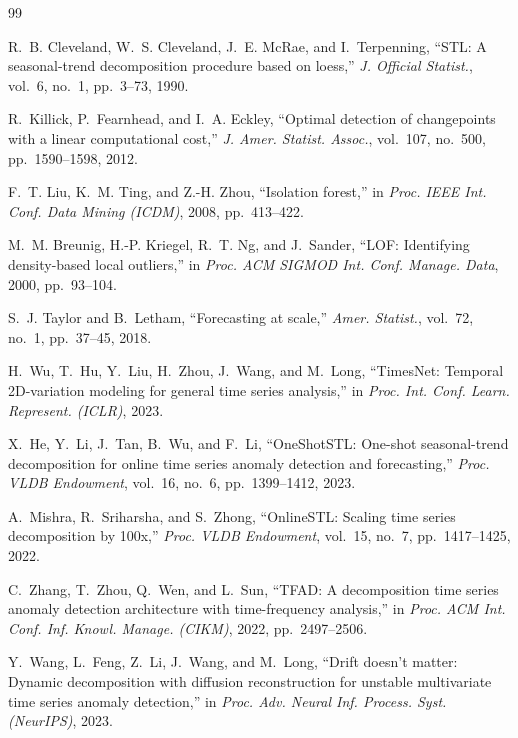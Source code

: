 \documentclass[10pt]{article}
\begin{document}
\begin{thebibliography}{99}
\RaggedRight

R.~B. Cleveland, W.~S. Cleveland, J.~E. McRae, and I.~Terpenning, ``STL: A seasonal-trend decomposition procedure based on loess,'' \textit{J. Official Statist.}, vol.~6, no.~1, pp.~3--73, 1990.

R.~Killick, P.~Fearnhead, and I.~A. Eckley, ``Optimal detection of changepoints with a linear computational cost,'' \textit{J. Amer. Statist. Assoc.}, vol.~107, no.~500, pp.~1590--1598, 2012.

F.~T. Liu, K.~M. Ting, and Z.-H. Zhou, ``Isolation forest,'' in \textit{Proc. IEEE Int. Conf. Data Mining (ICDM)}, 2008, pp.~413--422.

M.~M. Breunig, H.-P. Kriegel, R.~T. Ng, and J.~Sander, ``LOF: Identifying density-based local outliers,'' in \textit{Proc. ACM SIGMOD Int. Conf. Manage. Data}, 2000, pp.~93--104.

S.~J. Taylor and B.~Letham, ``Forecasting at scale,'' \textit{Amer. Statist.}, vol.~72, no.~1, pp.~37--45, 2018.

H.~Wu, T.~Hu, Y.~Liu, H.~Zhou, J.~Wang, and M.~Long, ``TimesNet: Temporal 2D-variation modeling for general time series analysis,'' in \textit{Proc. Int. Conf. Learn. Represent. (ICLR)}, 2023.

X.~He, Y.~Li, J.~Tan, B.~Wu, and F.~Li, ``OneShotSTL: One-shot seasonal-trend decomposition for online time series anomaly detection and forecasting,'' \textit{Proc. VLDB Endowment}, vol.~16, no.~6, pp.~1399--1412, 2023.

A.~Mishra, R.~Sriharsha, and S.~Zhong, ``OnlineSTL: Scaling time series decomposition by 100x,'' \textit{Proc. VLDB Endowment}, vol.~15, no.~7, pp.~1417--1425, 2022.

C.~Zhang, T.~Zhou, Q.~Wen, and L.~Sun, ``TFAD: A decomposition time series anomaly detection architecture with time-frequency analysis,'' in \textit{Proc. ACM Int. Conf. Inf. Knowl. Manage. (CIKM)}, 2022, pp.~2497--2506.

Y.~Wang, L.~Feng, Z.~Li, J.~Wang, and M.~Long, ``Drift doesn't matter: Dynamic decomposition with diffusion reconstruction for unstable multivariate time series anomaly detection,'' in \textit{Proc. Adv. Neural Inf. Process. Syst. (NeurIPS)}, 2023.


\end{thebibliography}
\end{document}
